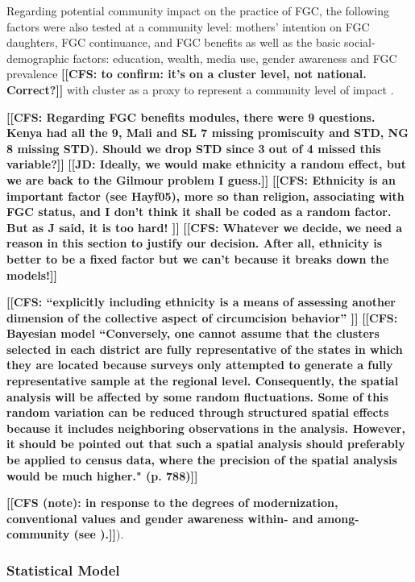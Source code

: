 \documentclass[12pt,]{article}
\newcommand{\comment}[1]{\textbf{[[#1]]}}
\newcommand{\cfcmt}[1]{\comment{CFS: #1}}
\newcommand{\cfonly}[1]{\comment{CFS (note): #1}}
\newcommand{\jdcmt}[1]{\comment{JD: #1}}
\begin{document}
Regarding potential community impact on the practice of FGC, the following factors were also tested at a community level:  mothers' intention on FGC daughters, FGC continuance, and FGC benefits as well as the basic social-demographic factors:  education, wealth, media use, gender awareness and FGC prevalence \cfcmt{to confirm:  it's on a cluster level, not national.  Correct?} with cluster as a proxy to represent a community level of impact \cite{AligRen06, BoylSvec19, Hayf05, Krav02}.
 
\cfcmt{Regarding FGC benefits modules, there were 9 questions.  Kenya had all the 9, Mali and SL 7 missing promiscuity and STD, NG 8 missing STD).  Should we drop STD since 3 out of 4 missed this variable?}
\jdcmt{Ideally, we would make ethnicity a random effect, but we are back to the Gilmour problem I guess.} \cfcmt{Ethnicity is an important factor (see Hayf05), more so than religion, associating with FGC status, and I don't think it shall be coded as a random factor.  But as J said, it is too hard! } \cfcmt{Whatever we decide, we need a reason in this section to justify our decision. After all, ethnicity is better to be a fixed factor but we can’t because it breaks down the models!}

\cfcmt{“explicitly including ethnicity is a means of assessing another dimension of the collective aspect of circumcision behavior” \cite{Hayf05}}
\cfcmt{Bayesian model \cite{KandNwak09} “Conversely, one cannot assume that the clusters selected in each district are fully representative of the states in which they are located because surveys only attempted to generate a fully representative sample at the regional level. Consequently, the spatial analysis will be affected by some random fluctuations.  Some of this random variation can be reduced through structured spatial effects because it includes neighboring observations in the analysis. However, it should be pointed out that such a spatial analysis should preferably be applied to census data, where the precision of the spatial analysis would be much higher." (p. 788)}

\cfonly {in response to the degrees of modernization, conventional values and gender awareness within- and among-community (see \cite{Achi14, BoylMcMo02, Hayf05, KandNwak09, ModrLiu13, Moor13, OdukAfol17, Youn02}).}).

\subsubsection{Statistical Model}\label{statistical-model}
\end{document}
